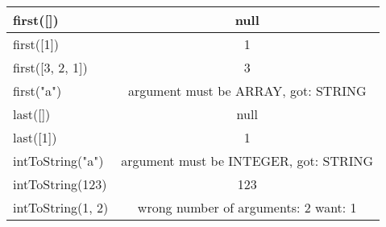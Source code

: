 \begin{table}[!ht]
\begin{threeparttable}
\begin{tabularx}{\textwidth}{|X|c|}
            first({[}{]})                                                    & null                                       \\
            \hline
            first({[}1{]})                                                   & 1                                          \\
            \hline
            first({[}3, 2, 1{]})                                             & 3                                          \\
            \hline
            first("a")                                                       & argument must be ARRAY, got: STRING        \\
            \hline
            last({[}{]})                                                     & null                                       \\
            \hline
            last({[}1{]})                                                    & 1                                          \\
            \hline
            intToString("a")  & argument must be INTEGER, got: STRING \\
            \hline
            intToString(123)  & 123                                   \\
            \hline
            intToString(1, 2) & wrong number of arguments: 2 want: 1  \\
            \hline
        \end{tabularx}
    \end{threeparttable}
    \vspace{\bottompaddingoftable}
\end{table}

